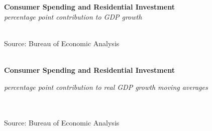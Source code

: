 \documentclass{report}
\makeatletter
\newcommand{\tbllink}[1]{\href{https://raw.githubusercontent.com/bdecon/US-chartbook/master/chartbook/data/#1}{\faTable}}
\newcommand*\short[1]{\expandafter\@gobbletwo\number\numexpr#1\relax}
\newcommand{\sbar}[4]{
		\addplot[ybar stacked, bar width=2.7pt, draw opacity=0, fill=#1] 
			table [x=#2, y=#3, col sep=comma]{#4};}
\newcommand{\stdnode}[3]{\node[below, align=left, shift=({#1,#2})]{#3};}
\newcommand{\dateaxisticks}{
		date coordinates in=x, axis line style={draw=none},
		xmax={2020-02-01},
		max space between ticks=40,	    
		xtick={{1990-01-01}, {1992-01-01}, {1994-01-01}, 
			{1996-01-01}, {1998-01-01}, {2000-01-01}, 
			{2002-01-01}, {2004-01-01}, {2006-01-01},
			{2008-01-01}, {2010-01-01}, {2012-01-01}, {2014-01-01},
		    {2016-01-01}, {2018-01-01}, {2020-01-01}},
		minor xtick={{1989-01-01}, {1991-01-01}, {1993-01-01},
			{1995-01-01}, {1997-01-01}, {1999-01-01}, 
			{2001-01-01}, {2003-01-01}, {2005-01-01}, {2007-01-01},
		    {2009-01-01}, {2011-01-01}, {2013-01-01}, {2015-01-01},
		    {2017-01-01}, {2019-01-01}},
		enlarge y limits={0.06}, enlarge x limits={0.01},
		}
\newcommand{\bbar}[2]{extra #1 ticks = {{#2}}, extra #1 tick labels = ,
		extra #1 tick style = {grid=major, grid style={thick, black!25}},}
\newcommand{\rbars}{
		\fill[color=black!10] (axis cs:{1990-07-01},\pgfkeysvalueof{/pgfplots/ymin}) rectangle 
			(axis cs:{1991-03-01}, \pgfkeysvalueof{/pgfplots/ymax});
		\fill[color=black!10] (axis cs:{2007-12-01},\pgfkeysvalueof{/pgfplots/ymin}) rectangle 
			(axis cs:{2009-07-01}, \pgfkeysvalueof{/pgfplots/ymax});
		\fill[color=black!10] (axis cs:{2001-03-01},\pgfkeysvalueof{/pgfplots/ymin}) rectangle 
			(axis cs:{2001-11-01}, \pgfkeysvalueof{/pgfplots/ymax});}
\makeatother
\begin{document}
{{\begin{minipage}{0.76\textwidth}
\noindent \normalsize \textbf{Consumer Spending and Residential Investment}\\
\footnotesize{\textit{percentage point contribution to GDP growth}}\\
\noindent \hspace*{-2mm} \\
\footnotesize{Source: Bureau of Economic Analysis} \hfill \tbllink{pce.csv}\\

\small

 

\end{minipage}\\

\noindent \normalsize \textbf{Consumer Spending and Residential Investment}\\
\footnotesize{\textit{percentage point contribution to real GDP growth \hspace{36mm} moving averages}\\ \vspace{4mm}
\noindent {} \setlength{\tabcolsep}{3.1pt} \color{black!90}
		{\renewcommand{\arraystretch}{1.55}
		 \begin{tabular}{p{2.0mm} p{38mm} R{6.7mm} R{6.7mm} R{6.7mm} R{6.7mm} R{6.7mm} 
		   R{7.8mm} R{6.7mm} R{6.7mm} }
			 
			 \hline
		\end{tabular}
		}	\\
		
\vspace{-6mm}
\footnotesize{Source: Bureau of Economic Analysis}

\newpage 

\begin{minipage}{0.76\textwidth}

\small \\


\end{minipage}}}}
\end{document}
